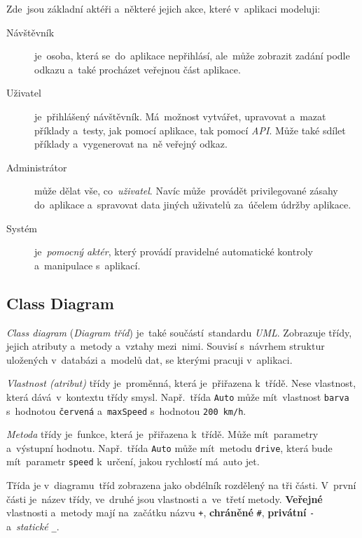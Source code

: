 \documentclass[11pt,a4paper]{report}
\let\oldacrshort\acrshort
\renewcommand{\acrshort}[1]{\emph{\normalsize\color[rgb]{0,0,0}\noindent\oldacrshort{#1}}}
\begin{document}
                Zde~jsou základní aktéři a~některé jejich akce, které v~aplikaci modeluji:
                \begin{description}
                    \item[Návštěvník] je~osoba, která se~do~aplikace nepřihlásí, ale~může zobrazit zadání podle odkazu a~také procházet veřejnou část aplikace.
                    \item[Uživatel] je~přihlášený návštěvník. Má~možnost vytvářet, upravovat a~mazat příklady a~testy, jak pomocí aplikace, tak pomocí \acrshort{API}. Může také sdílet příklady a~vygenerovat na~ně veřejný odkaz.
                    \item[Administrátor] může dělat vše, co~\emph{uživatel}. Navíc může~provádět privilegované zásahy do~aplikace a~spravovat data jiných uživatelů za~účelem údržby aplikace.
                    \item[Systém] je~\emph{pomocný aktér}, který provádí pravidelné automatické kontroly a~manipulace s~aplikací.
                \end{description}

            \subsection{Class Diagram}
                \emph{Class diagram} (\emph{Diagram tříd}) je~také součástí~standardu \emph{UML}. Zobrazuje třídy, jejich atributy a~metody a~vztahy mezi~nimi. Souvisí s~návrhem struktur uložených v~databázi a~modelů dat, se kterými pracuji v~aplikaci.

                \emph{Vlastnost (atribut)} třídy je~proměnná, která je~přiřazena k~třídě. Nese vlastnost, která dává~v~kontextu třídy smysl. Např.~třída \texttt{Auto} může mít~vlastnost \texttt{barva} s~hodnotou \texttt{červená} a~\texttt{maxSpeed} s~hodnotou \texttt{200\,km/h}.

                \emph{Metoda} třídy je~funkce, která je~přiřazena k~třídě. Může mít~parametry a~výstupní hodnotu. Např.~třída \texttt{Auto} může mít~metodu \texttt{drive}, která bude mít~parametr \texttt{speed} k~určení, jakou rychlostí má~auto jet.
                
                Třída je v~diagramu~tříd zobrazena jako obdélník rozdělený na tři části. V~první části je~název třídy, ve~druhé jsou vlastnosti a~ve~třetí metody. \textbf{Veřejné} vlastnosti a~metody mají na~začátku názvu \texttt{+}, \textbf{chráněné} \texttt{\#}, \textbf{privátní} \texttt{-} a~\emph{statické} \texttt{\_}.
\end{document}

